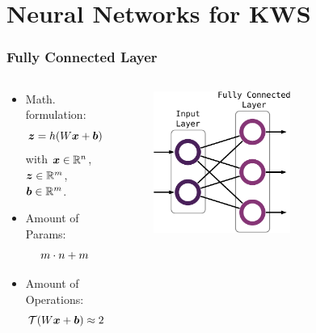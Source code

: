 
\section{Neural Networks for KWS}

\begin{frame}
  \frametitle{Fully Connected Layer}
  \vspace{-0.75cm}
  \begin{columns}
    \begin{column}{0.5\textwidth}
      \begin{itemize}
        \item Math. formulation:
        \begin{equation*}
          \footnotesize
          \bm{z} = h(W \bm{x} + \bm{b})
        \end{equation*}
        {\footnotesize with $\bm{x} \in \mathbb{R}^n$, $\bm{z} \in \mathbb{R}^m$, $\bm{b} \in \mathbb{R}^m$.}
        \vspace{0.2cm}
        \item Amount of Params:
        \begin{equation*}
          \footnotesize
          m \cdot n + m
        \end{equation*}
        \item Amount of Operations:
        \begin{equation*}
          \footnotesize
          \mathcal{T}(W \bm{x} + \bm{b}) \approx 2 (m \cdot n) + m
        \end{equation*}     
      \end{itemize}
    \end{column}
    \begin{column}{0.5\textwidth}
      \vspace{0.75cm}
      \centering
      \begin{figure} \includegraphics[width=0.6\textwidth]{../4_nn/figs/nn_theory_fc.pdf} \end{figure}
      \vfill
    \end{column}
  \end{columns}
\end{frame}

